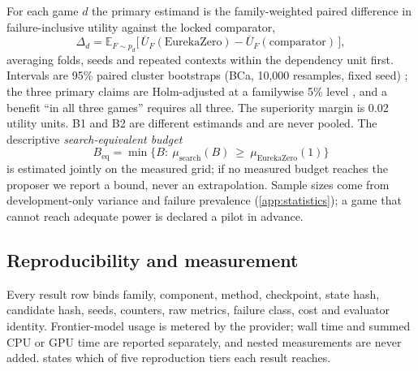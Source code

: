 For each game $d$ the primary estimand is the family-weighted paired difference in failure-inclusive
utility against the locked comparator,
\begin{equation}
\Delta_d=\mathbb E_{F\sim p_d}\bigl[\,\overline U_F(\text{EurekaZero})-\overline U_F(\text{comparator})\,\bigr],
\label{eq:delta}
\end{equation}
averaging folds, seeds and repeated contexts within the dependency unit first. Intervals are 95\%
paired cluster bootstraps (BCa, 10,000 resamples, fixed seed) \citep{efron1987bca}; the three primary
claims are Holm-adjusted at a familywise 5\% level \citep{holm1979}, and a benefit ``in all three
games'' requires all three. The superiority margin is 0.02 utility units. B1 and B2 are different
estimands and are never pooled. The descriptive \emph{search-equivalent budget}
\begin{equation}
B_{\mathrm{eq}}=\min\bigl\{B:\ \mu_{\mathrm{search}}(B)\ \ge\ \mu_{\mathrm{EurekaZero}}(1)\bigr\}
\label{eq:beq}
\end{equation}
is estimated jointly on the measured grid; if no measured budget reaches the proposer we report a
bound, never an extrapolation. Sample sizes come from development-only variance and failure prevalence
(\cref{app:statistics}); a game that cannot reach adequate power is declared a pilot in advance.

\subsection{Reproducibility and measurement}

Every result row binds family, component, method, checkpoint, state hash, candidate hash, seeds,
counters, raw metrics, failure class, cost and evaluator identity. Frontier-model usage is metered by
the provider; wall time and summed CPU or GPU time are reported separately, and nested measurements are
never added.  states which of five reproduction tiers each result reaches.
